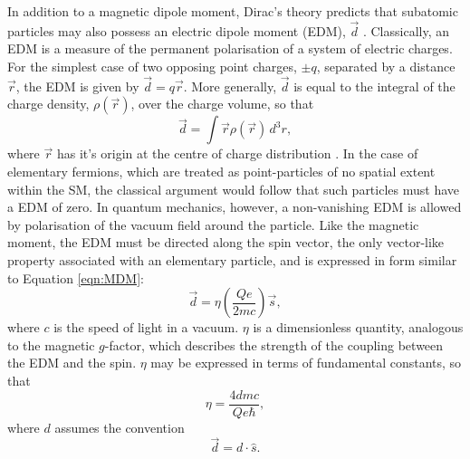 In addition to a magnetic dipole moment, Dirac's theory predicts that subatomic particles may also possess an electric dipole moment (EDM), $\vec{d}$ \cite{LeptonDipoleMoments}. Classically, an EDM is a measure of the permanent polarisation of a system of electric charges. For the simplest case of two opposing point charges, $\pm q$, separated by a distance $\vec{r}$, the EDM is given by $\vec{d}=q\vec{r}$. More generally, $\vec{d}$ is equal to the integral of the charge density, $\rho(\vec{r})$, over the charge volume, so that
%
\begin{equation} 
  \vec{d} = \int{\vec{r}\rho(\vec{r})\,d^{3}r},
  \label{eqn:EDMIntegral}
\end{equation}
%
where $\vec{r}$ has it's origin at the centre of charge distribution \cite{Jackson}. In the case of elementary fermions, which are treated as point-particles of no spatial extent within the SM, the classical argument would follow that such particles must have a EDM of zero. In quantum mechanics, however, a non-vanishing EDM is allowed by polarisation of the vacuum field around the particle. Like the magnetic moment, the EDM must be directed along the spin vector, the only vector-like property associated with an elementary particle, and is expressed in form similar to Equation \ref{eqn:MDM}:
%
\begin{equation} 
  \vec{d} = \eta \left(\frac{Qe}{2mc}\right)\vec{s},
  \label{eqn:EDM}
\end{equation}
%
where $c$ is the speed of light in a vacuum. $\eta$ is a dimensionless quantity, analogous to the magnetic $g$-factor, which describes the strength of the coupling between the EDM and the spin. $\eta$ may be expressed in terms of fundamental constants, so that
%
\begin{equation} 
  \eta = \frac{4dmc}{Qe\hbar},
  \label{eqn:eta}
\end{equation}
%
where $d$ assumes the convention
%
\begin{equation} 
  \vec{d} = d\cdot\hat{s}. %
  \label{eqn:scalarEDM}
\end{equation}

